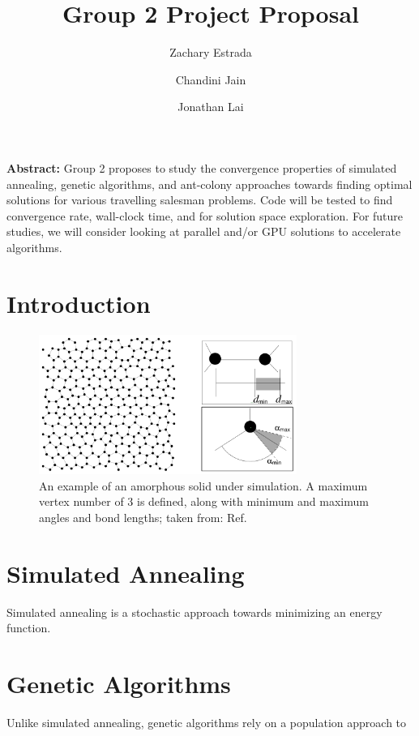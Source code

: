 \documentclass[12pt,onecolumn,notitlepage]{article}
\title{\vspace{-4ex} \textbf{Group 2 Project Proposal}}
\author{Zachary Estrada \and Chandini Jain \and Jonathan Lai}
\begin{document}
\maketitle

\textbf{Abstract:} Group 2 proposes to study the convergence
properties of simulated annealing, genetic algorithms, and ant-colony approaches towards
finding optimal solutions for various travelling salesman problems.  Code will be tested
to find convergence rate, wall-clock time, and for solution space exploration.  For future studies,
we will consider looking at parallel and/or GPU solutions to accelerate algorithms.

\section{Introduction}
\begin{figure}
\centering
\includegraphics[width=0.75\textwidth]{Figures/amorphousSilicon.png}
\caption{An example of an amorphous solid under simulation.  A maximum vertex number of 3 is defined, along with minimum and maximum angles and bond lengths; taken from: Ref. \protect{}}
\label{fig:amorphousSilicon}
\end{figure}


\section{Simulated Annealing}
Simulated annealing is a stochastic approach towards minimizing an energy function.

\section{Genetic Algorithms}
Unlike simulated annealing, genetic algorithms rely on a population approach to 
\end{document}
